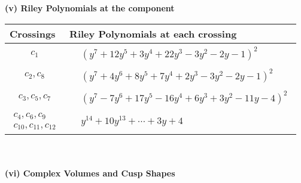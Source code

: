 \documentclass[1p]{elsarticle_modified}
\theoremstyle{definition}
\begin{document}
\newpage\renewcommand{\arraystretch}{1}
\flushleft \textbf{(v) Riley Polynomials at the component}\newline \\
\begin{tabular}{m{50pt}|m{274pt}}
Crossings & \hspace{64pt}Riley Polynomials at each crossing \\
\hline $$\begin{aligned}c_{1}\end{aligned}$$&$\begin{aligned}
&(y^7+12 y^5+3 y^4+22 y^3-3 y^2-2 y-1)^2
\end{aligned}$\\
\hline $$\begin{aligned}c_{2},c_{8}\end{aligned}$$&$\begin{aligned}
&(y^7+4 y^6+8 y^5+7 y^4+2 y^3-3 y^2-2 y-1)^2
\end{aligned}$\\
\hline $$\begin{aligned}c_{3},c_{5},c_{7}\end{aligned}$$&$\begin{aligned}
&(y^7-7 y^6+17 y^5-16 y^4+6 y^3+3 y^2-11 y-4)^2
\end{aligned}$\\
\hline $$\begin{aligned}c_{4},c_{6},c_{9}\\c_{10},c_{11},c_{12}\end{aligned}$$&$\begin{aligned}
&y^{14}+10 y^{13}+\cdots+3 y+4
\end{aligned}$\\
\hline
\end{tabular}\\~\\
\newpage\flushleft \textbf{(vi) Complex Volumes and Cusp Shapes}
\end{document}
